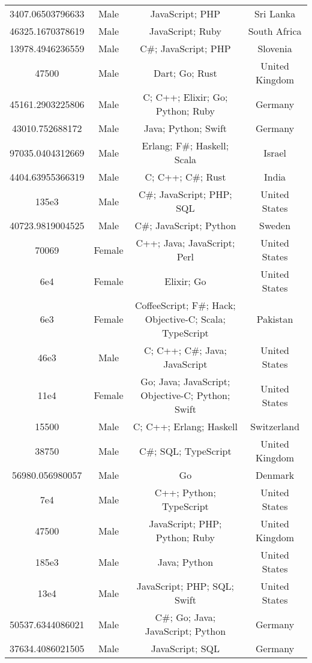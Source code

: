 \begin{center}
\begin{tabular}{ |c|c|c|c| }
3407.06503796633  &  Male  &  JavaScript; PHP  &  Sri Lanka  \\ 
46325.1670378619  &  Male  &  JavaScript; Ruby  &  South Africa  \\ 
13978.4946236559  &  Male  &  C\#; JavaScript; PHP  &  Slovenia  \\ 
47500  &  Male  &  Dart; Go; Rust  &  United Kingdom  \\ 
45161.2903225806  &  Male  &  C; C++; Elixir; Go; Python; Ruby  &  Germany  \\ 
43010.752688172  &  Male  &  Java; Python; Swift  &  Germany  \\ 
97035.0404312669  &  Male  &  Erlang; F\#; Haskell; Scala  &  Israel  \\ 
4404.63955366319  &  Male  &  C; C++; C\#; Rust  &  India  \\ 
135e3  &  Male  &  C\#; JavaScript; PHP; SQL  &  United States  \\ 
40723.9819004525  &  Male  &  C\#; JavaScript; Python  &  Sweden  \\ 
70069  &  Female  &  C++; Java; JavaScript; Perl  &  United States  \\ 
6e4  &  Female  &  Elixir; Go  &  United States  \\ 
6e3  &  Female  &  CoffeeScript; F\#; Hack; Objective-C; Scala; TypeScript  &  Pakistan  \\ 
46e3  &  Male  &  C; C++; C\#; Java; JavaScript  &  United States  \\ 
11e4  &  Female  &  Go; Java; JavaScript; Objective-C; Python; Swift  &  United States  \\ 
15500  &  Male  &  C; C++; Erlang; Haskell  &  Switzerland  \\ 
38750  &  Male  &  C\#; SQL; TypeScript  &  United Kingdom  \\ 
56980.056980057  &  Male  &  Go  &  Denmark  \\ 
7e4  &  Male  &  C++; Python; TypeScript  &  United States  \\ 
47500  &  Male  &  JavaScript; PHP; Python; Ruby  &  United Kingdom  \\ 
185e3  &  Male  &  Java; Python  &  United States  \\ 
13e4  &  Male  &  JavaScript; PHP; SQL; Swift  &  United States  \\ 
50537.6344086021  &  Male  &  C\#; Go; Java; JavaScript; Python  &  Germany  \\ 
37634.4086021505  &  Male  &  JavaScript; SQL  &  Germany  \\ 

\end{tabular}
\end{center}
